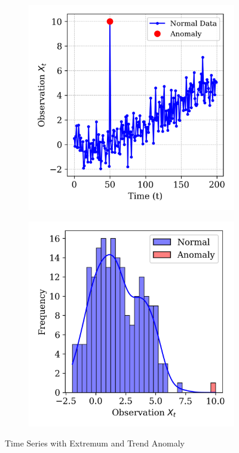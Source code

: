 \begin{figure}
    \centering
    \begin{subfigure}[b]{0.45\textwidth}
        \centering
        \includegraphics[width=\textwidth]{plots/temporal_correlation_plots/run_chart_with_anomaly.png}
        \label{fig:run_chart}
    \end{subfigure}
    \hfill
    \begin{subfigure}[b]{0.45\textwidth}
        \centering
        \includegraphics[width=\textwidth]{plots/temporal_correlation_plots/distribution_chart_with_anomaly.png}
        \label{fig:distribution_chart}
    \end{subfigure}
    
    \caption{Time Series with Extremum and Trend Anomaly}
    \label{fig:temporal_correlation_comparison}
\end{figure}